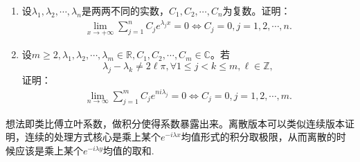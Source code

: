 \documentclass[../../main.tex]{subfiles}%
\begin{document}
\begin{proposition}\label{proposition:三角求和极限结论1}
\begin{enumerate}
\item 设$\lambda_1,\lambda_2,\cdots,\lambda_n$是两两不同的实数，$C_1,C_2,\cdots,C_n$为复数。证明：
\begin{align*}
\lim_{x\to+\infty}\sum_{j=1}^n C_j e^{\lambda_j x}=0 \Leftrightarrow C_j=0,j=1,2,\cdots,n.
\end{align*}

\item 设$m\geqslant 2,\lambda_1,\lambda_2,\cdots,\lambda_m\in\mathbb{R},C_1,C_2,\cdots,C_m\in\mathbb{C}$。若
\[
\lambda_j-\lambda_k\neq2\ell\pi,\forall1\leqslant  j<k\leqslant  m,\ell\in\mathbb{Z},
\]
证明：
\begin{align*}
\lim_{n\to\infty}\sum_{j=1}^m C_j e^{ni\lambda_j}=0 \Leftrightarrow C_j=0,j=1,2,\cdots,m.
\end{align*}
\end{enumerate}
\end{proposition}
\begin{note}
想法即类比傅立叶系数，做积分使得系数暴露出来。离散版本可以类似连续版本证明，连续的处理方式核心是乘上某个$e^{-i\lambda x}$均值形式的积分取极限，从而离散的时候应该是乘上某个$e^{-i\lambda y}$均值的取和.
\end{note}
\end{document}
